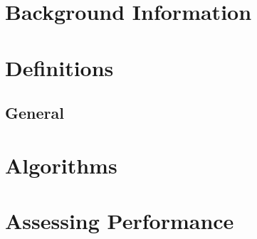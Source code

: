 \documentclass[a4paper,12pt,twoside]{report}
\begin{document}
    \tableofcontents
    \newpage

	\chapter{Background Information}
        

	\chapter{Definitions}
        \section{General}
            

	\chapter{Algorithms}
        

    \chapter{Assessing Performance}
        
\end{document}
